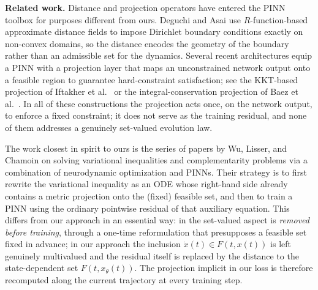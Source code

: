 \documentclass[11pt]{elsarticle}
\theoremstyle{definition}
\theoremstyle{remark}
\numberwithin{equation}{section}
\begin{document}
	\noindent\textbf{Related work.} 
	Distance and projection operators have entered the PINN toolbox for
	purposes different from ours.  Deguchi and Asai \cite{deguchi2025} use
	$R$-function-based approximate distance fields to impose Dirichlet
	boundary conditions exactly on non-convex domains, so the distance
	encodes the geometry of the boundary rather than an admissible set for
	the dynamics.  Several recent architectures equip a PINN with a
	projection layer that maps an unconstrained network output onto a
	feasible region to guarantee hard-constraint satisfaction; see the
	KKT-based projection of Iftakher et al.\ \cite{iftakher2025} or the
	integral-conservation projection of Baez et al.\ \cite{baez2025}.  In
	all of these constructions the projection acts once, on the network
	output, to enforce a fixed constraint; it does not serve as the training
	residual, and none of them addresses a genuinely set-valued evolution law.
	
	The work closest in spirit to ours is the series of papers by Wu,
	Lisser, and Chamoin
	\cite{wu2023,wu2024neuropinn,wu2024cmame,wu2025errorbound} on solving
	variational inequalities and complementarity problems via a combination
	of neurodynamic optimization and PINNs.  Their strategy is to first
	rewrite the variational inequality as an ODE whose right-hand side
	already contains a metric projection onto the (fixed) feasible set, and
	then to train a PINN using the ordinary pointwise residual of that
	auxiliary equation.  This differs from our approach in an essential way:
	in \cite{wu2023,wu2024neuropinn,wu2024cmame,wu2025errorbound} the
	set-valued aspect is \emph{removed before training}, through a one-time
	reformulation that presupposes a feasible set fixed in advance; in our
	approach the inclusion $\dot{x}(t)\in F(t,x(t))$ is left genuinely
	multivalued and the residual itself is replaced by the distance to the
	state-dependent set $F(t,x_\theta(t))$.  The projection implicit in our
	loss is therefore recomputed along the current trajectory at every
	training step.
	
\end{document}
